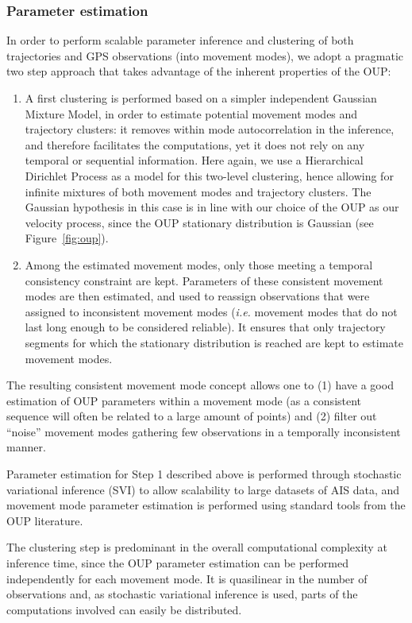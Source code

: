 \subsubsection{Parameter estimation}

In order to perform scalable parameter inference and clustering of both
trajectories and GPS observations (into movement modes), we adopt a pragmatic
two step approach that takes advantage of the inherent properties of the OUP:

\begin{enumerate}
\item A first clustering is performed based on a simpler independent
Gaussian Mixture Model, in order to estimate potential movement modes and
trajectory clusters: it removes within mode autocorrelation in
the inference, and therefore facilitates the computations, yet it does not rely
on any temporal or sequential information.
Here again, we use a Hierarchical Dirichlet Process as a model for this
two-level clustering, hence allowing for infinite mixtures of both movement
modes and trajectory clusters.
The Gaussian hypothesis in this case is in line with our choice of the OUP as
our velocity process, since the OUP stationary distribution is Gaussian
(see Figure~\ref{fig:oup}).
\item Among the estimated movement modes, only those meeting a temporal consistency
constraint are kept.
Parameters of these consistent movement modes are then estimated, and used to
reassign observations that were assigned to inconsistent movement modes (\emph{i.e.}
movement modes that do not last long enough to be considered reliable).
It ensures that only trajectory segments for which the stationary distribution
is reached are kept to estimate movement modes.
\end{enumerate}

The resulting consistent movement mode concept allows one to (1) have a good
estimation of OUP parameters within a movement mode (as a consistent sequence
will often be related to a large amount of points) and (2) filter out
``noise'' movement modes gathering few observations in a temporally
inconsistent manner.

Parameter estimation for Step 1 described above is performed through stochastic
variational inference (SVI) to allow scalability to large datasets of AIS data,
and movement mode parameter estimation is performed using standard tools from
the OUP literature.

The clustering
step is predominant in the overall computational complexity at inference time,
since the OUP parameter estimation can be performed independently for each
movement mode.
It is quasilinear in the number of
observations and, as stochastic variational inference is used, parts of the
computations involved can easily be distributed.

